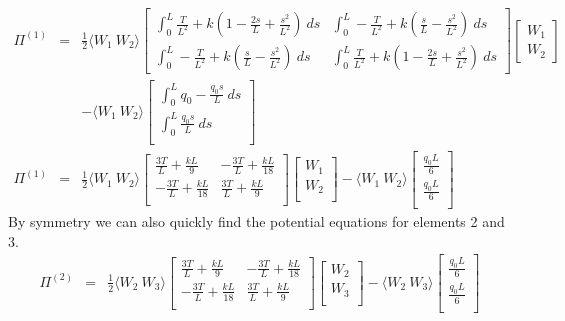 \documentclass[a4paper]{article}
\begin{document}
\begin{eqnarray*}
\Pi^{(1)} & = &
\frac{1}{2} \langle W_{1} \ W_{2}\rangle
\begin{bmatrix}
\int_{0}^{L}\frac{T}{L^{2}} + k(1 - \frac{2s}{L} + \frac{s^{2}}{L^{2}}) \ ds & \int_{0}^{L}-\frac{T}{L^{2}} + k(\frac{s}{L}-\frac{s^{2}}{L^{2}}) \ ds \\[3pt]
\int_{0}^{L}-\frac{T}{L^{2}} + k(\frac{s}{L}-\frac{s^{2}}{L^{2}}) \ ds & 
\int_{0}^{L}\frac{T}{L^{2}} + k(1 - \frac{2s}{L} + \frac{s^{2}}{L^{2}}) \ ds
\end{bmatrix}
\begin{bmatrix}
W_{1}\\
W_{2}
\end{bmatrix}\\
& & - \langle W_{1} \ W_{2} \rangle 
\begin{bmatrix}
\int_{0}^{L}q_{0}-\frac{q_{0}s}{L} \ ds\\
\int_{0}^{L}\frac{q_{0}s}{L} \ ds\\
\end{bmatrix}\\
\Pi^{(1)} & = & \frac{1}{2} \langle W_{1} \ W_{2} \rangle \begin{bmatrix}
\frac{3T}{L}+\frac{kL}{9} & -\frac{3T}{L}+ \frac{kL}{18}\\[3pt]
-\frac{3T}{L} + \frac{kL}{18} & 
\frac{3T}{L} + \frac{kL}{9}\\
\end{bmatrix}
\begin{bmatrix}
W_{1}\\
W_{2}\\
\end{bmatrix}
- \langle W_{1} \ W_{2} \rangle \begin{bmatrix}
\frac{q_{0}L}{6}\\
\frac{q_{0}L}{6}\\
\end{bmatrix}
\end{eqnarray*}
By symmetry we can also quickly find the potential equations for elements 2 and 3.
\begin{eqnarray*}
\Pi^{(2)} & = & \frac{1}{2} \langle W_{2} \ W_{3} \rangle \begin{bmatrix}
\frac{3T}{L}+\frac{kL}{9} & -\frac{3T}{L}+ \frac{kL}{18}\\[3pt]
-\frac{3T}{L} + \frac{kL}{18} & 
\frac{3T}{L} + \frac{kL}{9}\\
\end{bmatrix}
\begin{bmatrix}
W_{2}\\
W_{3}\\
\end{bmatrix}
- \langle W_{2} \ W_{3} \rangle \begin{bmatrix}
\frac{q_{0}L}{6}\\
\frac{q_{0}L}{6}\\
\end{bmatrix}
\end{eqnarray*}
\end{document}
